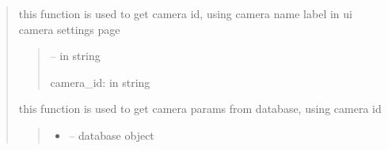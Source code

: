 \documentclass[letterpaper,10pt,english]{sphinxmanual}
\begin{document}
\begin{quote}
\begin{savenotes}
\begin{fulllineitems}
\begin{quote}
\begin{description}
\end{description}\end{quote}

\end{fulllineitems}\end{savenotes}


\begin{savenotes}\begin{fulllineitems}
\label{\detokenize{setting/backend/camera_funcs:oxin.backend.camera_funcs.get_camera_id}}
\pysigstartsignatures
{}
\pysigstopsignatures
\sphinxAtStartPar
this function is used to get camera id, using camera name label in ui camera settings page
\begin{quote}\begin{description}
\sphinxAtStartPar
{} – in string

\sphinxAtStartPar
camera\_id: in string

\end{description}\end{quote}

\end{fulllineitems}\end{savenotes}


\begin{savenotes}\begin{fulllineitems}
\label{\detokenize{setting/backend/camera_funcs:oxin.backend.camera_funcs.get_camera_params_from_db}}
\pysigstartsignatures
{}
\pysigstopsignatures
\sphinxAtStartPar
this function is used to get camera params from database, using camera id
\begin{quote}\begin{description}
\begin{itemize}
\item {} 
\sphinxAtStartPar
{} – database object


\end{itemize}
\end{description}
\end{quote}
\end{fulllineitems}
\end{savenotes}
\end{quote}
\end{document}
